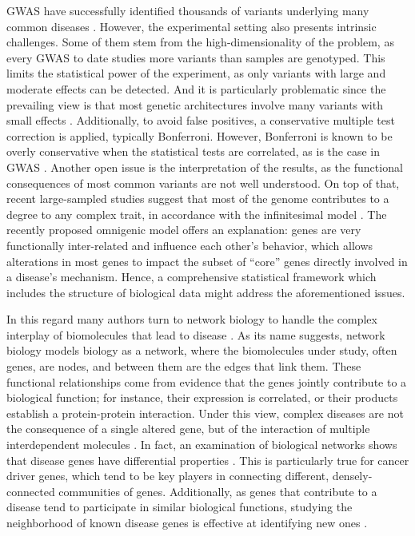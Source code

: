 \documentclass[twocolumn, 11pt, draft]{article}
\begin{document}
GWAS have successfully identified thousands of variants underlying many common diseases \cite{buniello_nhgri-ebi_2019}. However, the experimental setting also presents intrinsic challenges. Some of them stem from the high-dimensionality of the problem, as every GWAS to date studies more variants than samples are genotyped. This limits the statistical power of the experiment, as only variants with large and moderate effects can be detected. And it is particularly problematic since the prevailing view is that most genetic architectures involve many variants with small effects \cite{visscher_10_2017}. Additionally, to avoid false positives, a conservative multiple test correction is applied, typically Bonferroni. However, Bonferroni is known to be overly conservative when the statistical tests are correlated, as is the case in GWAS \cite{wang_statistical_2018}. Another open issue is the interpretation of the results, as the functional consequences of most common variants are not well understood. On top of that, recent large-sampled studies suggest that most of the genome contributes to a degree to any complex trait, in accordance with the infinitesimal model \cite{barton_infinitesimal_2017}. The recently proposed omnigenic model \cite{boyle_expanded_2017} offers an explanation: genes are very functionally inter-related and influence each other's behavior, which allows alterations in most genes to impact the subset of ``core'' genes directly involved in a disease's mechanism. Hence, a comprehensive statistical framework which includes the structure of biological data might address the aforementioned issues.

In this regard many authors turn to network biology to handle the complex interplay of biomolecules that lead to disease \cite{furlong_human_2013}. As its name suggests, network biology models biology as a network, where the biomolecules under study, often genes, are nodes, and between them are the edges that link them. These functional relationships come from evidence that the genes jointly contribute to a biological function; for instance, their expression is correlated, or their products establish a protein-protein interaction. Under this view, complex diseases are not the consequence of a single altered gene, but of the interaction of multiple interdependent molecules \cite{barabasi_network_2011}. In fact, an examination of biological networks shows that disease genes have differential properties \cite{barabasi_network_2011} \cite{pinero_uncovering_2016}. This is particularly true for cancer driver genes, which tend to be key players in connecting different, densely-connected communities of genes. Additionally, as genes that contribute to a disease tend to participate in similar biological functions, studying the neighborhood of known disease genes is effective at identifying new ones \cite{huang_systematic_2018}. 
\end{document}
